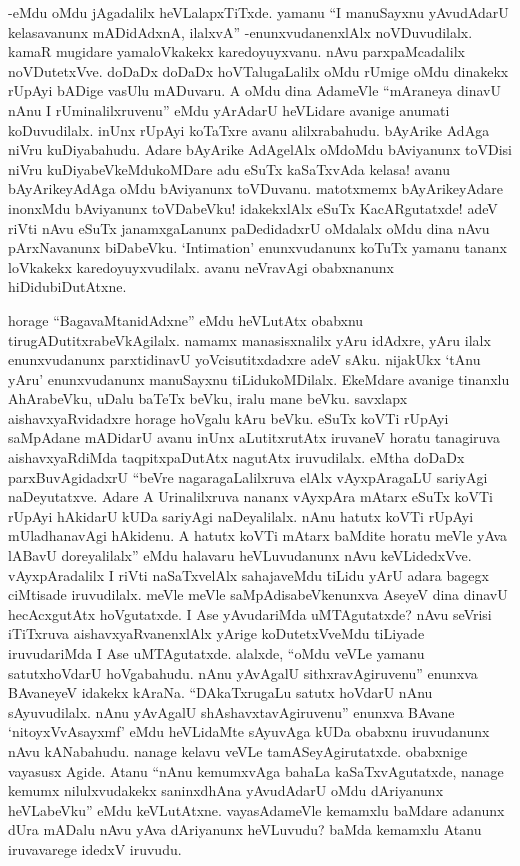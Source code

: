 -eMdu oMdu jAgadalilx heVLalapxTiTxde. yamanu ``I manuSayxnu yAvudAdarU kelasavanunx mADidAdxnA, ilalxvA'' -enunxvudanenxlAlx noVDuvudilalx. kamaR mugidare yamaloVkakekx karedoyuyxvanu. nAvu parxpaMcadalilx noVDutetxVve. doDaDx doDaDx hoVTalugaLalilx oMdu rUmige oMdu dinakekx {} rUpAyi bADige vasUlu mADuvaru. A oMdu dina AdameVle ``mAraneya dinavU nAnu I rUminalilxruvenu'' eMdu yArAdarU heVLidare avanige anumati koDuvudilalx. inUnx {} rUpAyi koTaTxre avanu alilxrabahudu. bAyArike AdAga niVru kuDiyabahudu. Adare bAyArike AdAgelAlx oMdoMdu bAviyanunx toVDisi niVru kuDiyabeVkeMdukoMDare adu eSuTx kaSaTxvAda kelasa! avanu bAyArikeyAdAga oMdu bAviyanunx toVDuvanu. matotxmemx bAyArikeyAdare inonxMdu bAviyanunx toVDabeVku! idakekxlAlx eSuTx KacARgutatxde! adeV riVti nAvu eSuTx janamxgaLanunx paDedidadxrU oMdalalx oMdu dina nAvu pArxNavanunx biDabeVku. `{\eng Intimation}' enunxvudanunx koTuTx yamanu tananx loVkakekx karedoyuyxvudilalx. avanu neVravAgi obabxnanunx hiDidubiDutAtxne.

horage ``BagavaMtanidAdxne'' eMdu heVLutAtx obabxnu tirugADutitxrabeVkAgilalx. namamx manasisxnalilx yAru idAdxre, yAru ilalx enunxvudanunx parxtidinavU yoVcisutitxdadxre adeV sAku. nijakUkx `tAnu yAru' enunxvudanunx manuSayxnu tiLidukoMDilalx. EkeMdare avanige tinanxlu AhArabeVku, uDalu baTeTx beVku, iralu mane beVku. savxlapx aishavxyaRvidadxre horage hoVgalu kAru beVku. eSuTx koVTi rUpAyi saMpAdane mADidarU avanu inUnx aLutitxrutAtx iruvaneV horatu tanagiruva aishavxyaRdiMda taqpitxpaDutAtx nagutAtx iruvudilalx. eMtha doDaDx parxBuvAgidadxrU ``beVre nagaragaLalilxruva elAlx vAyxpAragaLU sariyAgi naDeyutatxve. Adare A Urinalilxruva nananx vAyxpAra mAtarx eSuTx koVTi rUpAyi hAkidarU kUDa sariyAgi naDeyalilalx. nAnu hatutx koVTi rUpAyi mUladhanavAgi hAkidenu. A hatutx koVTi mAtarx baMdite horatu meVle yAva lABavU doreyalilalx'' eMdu halavaru heVLuvudanunx nAvu keVLidedxVve. vAyxpAradalilx I riVti naSaTxvelAlx sahajaveMdu tiLidu yArU adara bagegx ciMtisade iruvudilalx. meVle meVle saMpAdisabeVkenunxva AseyeV dina dinavU hecAcxgutAtx hoVgutatxde. I Ase yAvudariMda uMTAgutatxde? nAvu seVrisi iTiTxruva aishavxyaRvanenxlAlx yArige koDutetxVveMdu tiLiyade iruvudariMda I Ase uMTAgutatxde. alalxde, ``oMdu veVLe yamanu satutxhoVdarU hoVgabahudu. nAnu yAvAgalU sithxravAgiruvenu'' enunxva BAvaneyeV idakekx kAraNa. ``DAkaTxrugaLu satutx hoVdarU nAnu sAyuvudilalx. nAnu yAvAgalU shAshavxtavAgiruvenu'' enunxva BAvane `nitoyxVvAsayxmf' eMdu heVLidaMte sAyuvAga kUDa obabxnu iruvudanunx nAvu kANabahudu. nanage kelavu veVLe tamASeyAgirutatxde. obabxnige {} vayasusx Agide. Atanu ``nAnu kemumxvAga bahaLa kaSaTxvAgutatxde, nanage kemumx nilulxvudakekx saninxdhAna yAvudAdarU oMdu dAriyanunx heVLabeVku'' eMdu keVLutAtxne. {} vayasAdameVle kemamxlu baMdare adanunx dUra mADalu nAvu yAva dAriyanunx heVLuvudu? baMda kemamxlu Atanu iruvavarege idedxV iruvudu.

